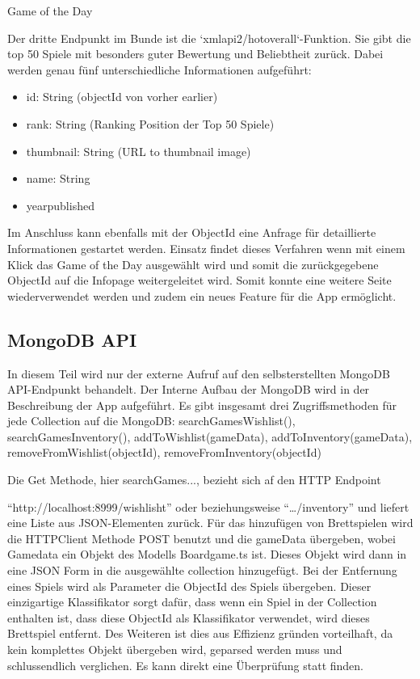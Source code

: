 \large Game of the Day

Der dritte Endpunkt im Bunde ist die `xmlapi2/hotoverall`-Funktion. Sie gibt die top 50 Spiele mit besonders guter Bewertung und Beliebtheit zurück.
Dabei werden genau fünf unterschiedliche Informationen aufgeführt:
\setlength{\itemsep}{-1pt}
\setlength{\parskip}{-1pt}
\begin{itemize}
    \item id: String (objectId von vorher earlier)
    \item rank: String (Ranking Position der Top 50 Spiele)
    \item thumbnail: String (URL to thumbnail image)
    \item name:  String        
    \item yearpublished 
\end{itemize}

Im Anschluss kann ebenfalls mit der ObjectId eine Anfrage für detaillierte Informationen gestartet werden. 
Einsatz findet dieses Verfahren wenn mit einem Klick das Game of the Day ausgewählt wird und somit die zurückgegebene ObjectId auf die Infopage
weitergeleitet wird. Somit konnte eine weitere Seite wiederverwendet werden und zudem ein neues Feature für die App ermöglicht. 

\subsection{MongoDB API}

In diesem Teil wird nur der externe Aufruf auf den selbsterstellten MongoDB API-Endpunkt behandelt. 
Der Interne Aufbau der MongoDB wird in der Beschreibung der App aufgeführt. Es gibt insgesamt drei Zugriffsmethoden für jede Collection auf die MongoDB: 
searchGamesWishlist(), searchGamesInventory(), addToWishlist(gameData), addToInventory(gameData), removeFromWishlist(objectId), removeFromInventory(objectId)\bigskip


Die Get Methode, hier searchGames..., bezieht sich af den HTTP Endpoint 

``http://localhost:8999/wishlisht'' oder beziehungsweise ``\ldots/inventory'' und liefert eine Liste aus JSON-Elementen zurück.
Für das hinzufügen von Brettspielen wird die HTTPClient Methode POST benutzt und die gameData übergeben, wobei Gamedata ein Objekt des Modells Boardgame.ts ist. 
Dieses Objekt wird dann in eine JSON Form in die ausgewählte collection hinzugefügt. Bei der Entfernung eines Spiels wird als Parameter die ObjectId des Spiels übergeben.
Dieser einzigartige Klassifikator sorgt dafür, dass wenn ein Spiel in der Collection enthalten ist, dass diese ObjectId als Klassifikator verwendet, wird dieses Brettspiel entfernt.
Des Weiteren ist dies aus Effizienz gründen vorteilhaft, da kein komplettes Objekt übergeben wird, geparsed werden muss und schlussendlich verglichen. Es kann direkt eine Überprüfung statt finden.



